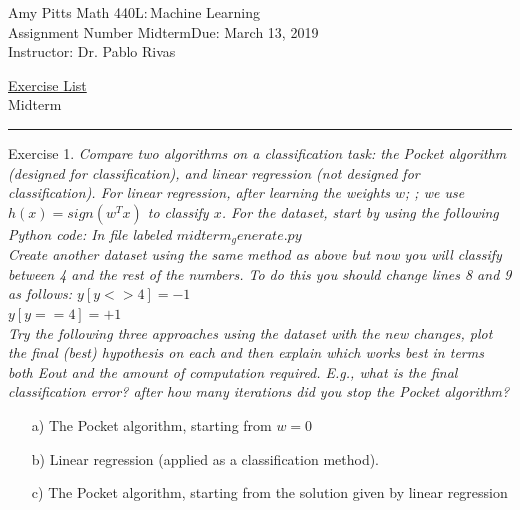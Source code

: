 \documentclass[12pt]{article}
\newcommand{\myname}{Amy Pitts} %
\newcommand{\duedate}{March 13, 2019} %
\newcommand{\courseno}{440L}      %
\newcommand{\coursename}{Machine Learning}    %
\newcommand{\instructorname}{Instructor: Dr. Pablo Rivas} %
\newcommand{\assignumber}{Midterm}   %
\newcommand{\exerciselist}{Midterm}      %
\newcommand{\firstpageinfo}  
    {\textsf{\large\myname}    \hfill     Math \courseno{:}\,\coursename \\
  Assignment Number \assignumber \hfill  Due:  \duedate \\
  \instructorname}
\newenvironment{exercise}[1][]{%
  \bigskip                          %
  \noindent \textsf{Exercise #1.}\slshape }{}
\begin{document}
\thispagestyle{empty}

\noindent\firstpageinfo
\begin{center} \underline{\textsf{Exercise List}}\\[5pt] \exerciselist \end{center}
\medskip\hrule




\begin{exercise}[1] %
  Compare two algorithms on a classification task: the Pocket 
  algorithm (designed for classification), and linear regression 
  (not designed for classification). For linear regression, after 
  learning the weights $w$; ; we use $h(x) = sign(w^T x)$ to 
  classify $x$. For the dataset, start by using the following 
  Python code: In file labeled $midterm_generate.py$ \\
  Create another dataset using the same method as above but now 
  you will classify between 4 and the rest of the numbers. 
  To do this you should change lines 8 and 9 as follows: 
  $y[y<>4] = -1$ \\ $y[y==4] = +1$ \\
  Try the following three approaches using the dataset with 
  the new changes, plot the final (best) hypothesis on each 
  and then explain which works best in terms both Eout and the 
  amount of computation required. E.g., what is the final 
  classification error? after how many iterations did you stop 
  the Pocket algorithm?
  \begin{enumerate}
    \item[a)] The Pocket algorithm, starting from $w = 0$
    \item[b)] Linear regression (applied as a classification method).
    \item[c)] The Pocket algorithm, starting from the solution given by linear regression  
  \end{enumerate}
\end{exercise}
   
\end{document}

